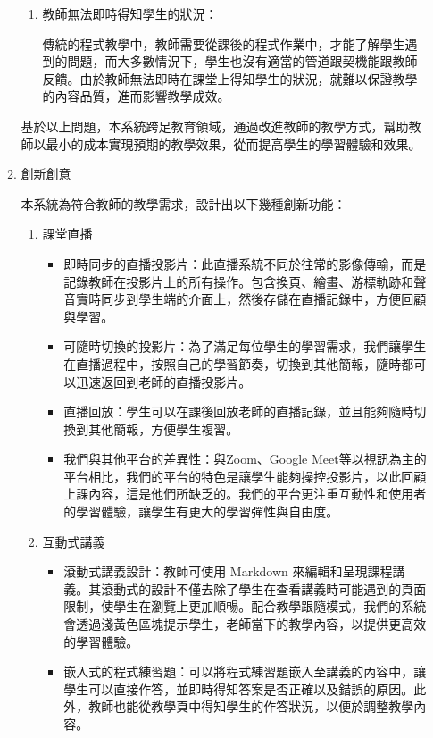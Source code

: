 \documentclass[12pt]{article}
\begin{document}
\begin{enumerate}
\begin{enumerate}
\begin{enumerate}[label=(\arabic*)]
      \item 教師無法即時得知學生的狀況：
        \par 傳統的程式教學中，教師需要從課後的程式作業中，才能了解學生遇到的問題，而大多數情況下，學生也沒有適當的管道跟契機能跟教師反饋。由於教師無法即時在課堂上得知學生的狀況，就難以保證教學的內容品質，進而影響教學成效\cite{ref7}。
    \end{enumerate}
    \par 基於以上問題，本系統跨足教育領域，通過改進教師的教學方式，幫助教師以最小的成本實現預期的教學效果，從而提高學生的學習體驗和效果。
    \item 創新創意
      \par 本系統為符合教師的教學需求，設計出以下幾種創新功能：
      \begin{enumerate}[label=(\arabic*)]
        \setlength{\parindent}{2em}
        \item 課堂直播
          \begin{itemize}
            \item 即時同步的直播投影片：此直播系統不同於往常的影像傳輸，而是記錄教師在投影片上的所有操作。包含換頁、繪畫、游標軌跡和聲音實時同步到學生端的介面上，然後存儲在直播記錄中，方便回顧與學習。
            \item 可隨時切換的投影片：為了滿足每位學生的學習需求，我們讓學生在直播過程中，按照自己的學習節奏，切換到其他簡報，隨時都可以迅速返回到老師的直播投影片。
            \item 直播回放：學生可以在課後回放老師的直播記錄，並且能夠隨時切換到其他簡報，方便學生複習。
            \item 我們與其他平台的差異性：與Zoom、Google Meet等以視訊為主的平台相比，我們的平台的特色是讓學生能夠操控投影片，以此回顧上課內容，這是他們所缺乏的。我們的平台更注重互動性和使用者的學習體驗，讓學生有更大的學習彈性與自由度。
          \end{itemize}
        \item 互動式講義
          \begin{itemize}
            \item 滾動式講義設計：教師可使用 Markdown 來編輯和呈現課程講義。其滾動式的設計不僅去除了學生在查看講義時可能遇到的頁面限制，使學生在瀏覽上更加順暢。配合教學跟隨模式，我們的系統會透過淺黃色區塊提示學生，老師當下的教學內容，以提供更高效的學習體驗。
            \item 嵌入式的程式練習題：可以將程式練習題嵌入至講義的內容中，讓學生可以直接作答，並即時得知答案是否正確以及錯誤的原因。此外，教師也能從教學頁中得知學生的作答狀況，以便於調整教學內容。

\end{itemize}
\end{enumerate}
\end{enumerate}
\end{enumerate}
\end{document}
